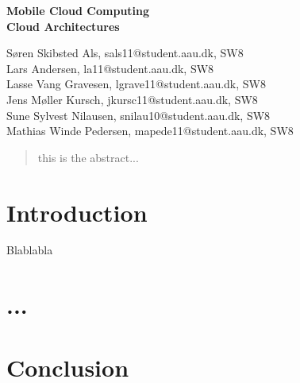 \documentclass[12pt,a4paper]{article}
\begin{document}
\begin{center}
\bigskip\bigskip
{\Large\bf Mobile Cloud Computing\\}
\bigskip
{\Large\bf Cloud Architectures}
\bigskip\bigskip


Søren Skibsted Als, sals11@student.aau.dk, SW8\\
Lars Andersen, la11@student.aau.dk, SW8\\
Lasse Vang Gravesen, lgrave11@student.aau.dk, SW8\\
Jens Møller Kursch, jkursc11@student.aau.dk, SW8\\
Sune Sylvest Nilausen, snilau10@student.aau.dk, SW8\\
Mathias Winde Pedersen, mapede11@student.aau.dk, SW8


\bigskip
\begin{abstract}
this is the abstract...
\end{abstract}

\thispagestyle{empty}
\end{center}


\titlepage

\thispagestyle{plain}


\section{Introduction}
Blablabla \citep{misc:mobilecloudcomputing}

\section{...}



\section{Conclusion}

\newpage


\label{bib:mybiblio}
\end{document}
